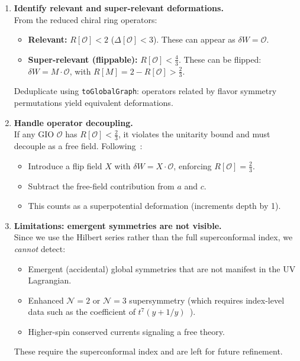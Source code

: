 \documentclass[12pt]{article}
\begin{document}
\begin{enumerate}[label=\textbf{3.\arabic*}]
\item \textbf{Identify relevant and super-relevant deformations.} \\
  From the reduced chiral ring operators:
  \begin{itemize}
    \item \textbf{Relevant:} $R[\mathcal{O}] < 2$ \; ($\Delta[\mathcal{O}] < 3$). These can appear as $\delta W = \mathcal{O}$.
    \item \textbf{Super-relevant (flippable):} $R[\mathcal{O}] < \frac{4}{3}$. These can be flipped: $\delta W = M \cdot \mathcal{O}$, with $R[M] = 2 - R[\mathcal{O}] > \frac{2}{3}$.
  \end{itemize}
  Deduplicate using \texttt{toGlobalGraph}: operators related by flavor symmetry permutations
  yield equivalent deformations.

\item \textbf{Handle operator decoupling.} \\
  If any GIO $\mathcal{O}$ has $R[\mathcal{O}] < \frac{2}{3}$, it violates the unitarity bound and must decouple
  as a free field. Following~\cite{CMNS}:
  \begin{itemize}
    \item Introduce a flip field $X$ with $\delta W = X \cdot \mathcal{O}$, enforcing $R[\mathcal{O}] = \frac{2}{3}$.
    \item Subtract the free-field contribution from $a$ and $c$.
    \item This counts as a superpotential deformation (increments depth by 1).
  \end{itemize}

\item \textbf{Limitations: emergent symmetries are not visible.} \\
  Since we use the Hilbert series rather than the full superconformal index,
  we \emph{cannot} detect:
  \begin{itemize}
    \item Emergent (accidental) global symmetries that are not manifest in the UV Lagrangian.
    \item Enhanced $\mathcal{N} = 2$ or $\mathcal{N} = 3$ supersymmetry (which requires index-level data such as the coefficient of $t^7(y + 1/y)$~\cite{CMNS}).
    \item Higher-spin conserved currents signaling a free theory.
  \end{itemize}
  These require the superconformal index and are left for future refinement.

\end{enumerate}
\end{document}
